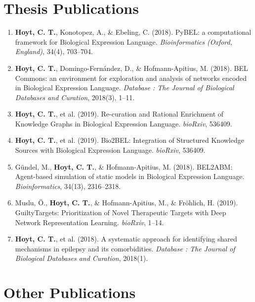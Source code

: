 \section*{Thesis Publications}

\begin{enumerate}
    \item \textbf{Hoyt, C. T.}, Konotopez, A., \& Ebeling, C. (2018). PyBEL: a computational framework for Biological Expression Language. \textit{Bioinformatics (Oxford, England)}, 34(4), 703–704.
    \item \textbf{Hoyt, C. T.}, Domingo-Fernández, D., \& Hofmann-Apitius, M. (2018). BEL Commons: an environment for exploration and analysis of networks encoded in Biological Expression Language. \textit{Database : The Journal of Biological Databases and Curation}, 2018(3), 1–11.
    \item \textbf{Hoyt, C. T.}, et al. (2019). Re-curation and Rational Enrichment of Knowledge Graphs in Biological Expression Language. \textit{bioRxiv}, 536409.
    \item \textbf{Hoyt, C. T.}, et al. (2019). Bio2BEL: Integration of Structured Knowledge Sources with Biological Expression Language. \textit{bioRxiv}, 536409.
    \item Gündel, M., \textbf{Hoyt, C. T.}, \& Hofmann-Apitius, M. (2018). BEL2ABM: Agent-based simulation of static models in Biological Expression Language. \textit{Bioinformatics}, 34(13), 2316–2318.
    \item Muslu, Ö., \textbf{Hoyt, C. T.}, \& Hofmann-Apitius, M., \& Fröhlich, H. (2019). GuiltyTargets: Prioritization of Novel Therapeutic Targets with Deep Network Representation Learning. \textit{bioRxiv}, 1–14.
    \item \textbf{Hoyt, C. T.}, et al. (2018). A systematic approach for identifying shared mechanisms in epilepsy and its comorbidities. \textit{Database : The Journal of Biological Databases and Curation}, 2018(1).
\end{enumerate}

\section*{Other Publications}

